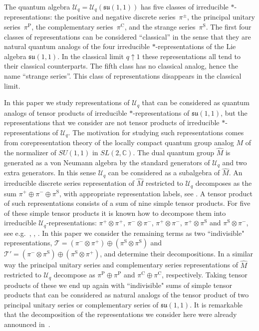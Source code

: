 \documentclass[pdftex]{sigma}
\numberwithin{equation}{section}
\numberwithin{theorem}{section}
\numberwithin{proposition}{section}
\numberwithin{lemma}{section}
\numberwithin{corollary}{section}
\numberwithin{definition}{section}
\numberwithin{example}{section}
\numberwithin{remark}{section}
\numberwithin{note}{section}
\newcommand{\C}{\mathbb C}
\newcommand{\su}{\mathfrak{su}}
\newcommand{\U}{\mathcal U}
\begin{document}
The quantum algebra $\U_q=\U_q(\su(1,1))$ has f\/ive classes of irreducible $*$-representations: the po\-si\-ti\-ve and negative discrete series~$\pi^\pm$, the principal unitary series~$\pi^{\mathrm{P}}$, the complementary series~$\pi^{\mathrm{C}}$, and the strange series~$\pi^{\mathrm{S}}$. The f\/irst four classes of representations can be considered ``classical'' in the sense that they are natural quantum analogs of the four irreducible $*$-representations of the Lie algebra $\su(1,1)$. In the classical limit $q \uparrow 1$ these representations all tend to their classical counterparts. The f\/ifth class has no classical analog, hence the name ``strange series''. This class of representations disappears in the classical limit.

In this paper we study representations of $\U_q$ that can be considered as quantum analogs of tensor products of irreducible $*$-representations of $\su(1,1)$, but the representations that we consider are not tensor products of irreducible $*$-representations of $\U_q$. The motivation for studying such representations comes from corepresentation theory of the locally compact quantum group analog $M$ of the normalizer of $SU(1,1)$ in $SL(2,\C)$. The dual quantum group $\widehat M$ is generated as a von Neumann algebra by the standard generators of $\U_q$ and two extra generators. In this sense $\U_q$ can be considered as a subalgebra of $\widehat M$.  An irreducible discrete series representation of $\widehat M$ restricted to $\U_q$ decomposes as the sum $\pi^+ \oplus \pi^- \oplus \pi^{\mathrm{S}}$, with appropriate representation labels, see \cite[Section 5]{GKK}. A tensor product of such representations consists of a sum of nine simple tensor products. For f\/ive of these simple tensor products it is known how to decompose them into irreducible $\U_q$-representations: $\pi^+\otimes \pi^+$, $\pi^- \otimes \pi^-$, $\pi^+\otimes \pi^-$, $\pi^+ \otimes \pi^{\mathrm{S}}$ and $\pi^{\mathrm{S}} \otimes \pi^-$, see e.g.~\cite[Section 4]{KMM}, \cite[Section 2]{KM}, \cite[Section 8]{Gr06}. In this paper we consider the remaining terms as two ``indivisible" representations, $\mathcal T =(\pi^- \otimes \pi^+) \oplus (\pi^{\mathrm{S}} \otimes \pi^{\mathrm{S}})$ and $\mathcal T'=(\pi^- \otimes \pi^{\mathrm{S}}) \oplus (\pi^{\mathrm{S}} \otimes \pi^+)$, and determine their decompositions. In a similar way the principal unitary series and complementary series representations of $\widehat M$ restricted to $\U_q$ decompose as $\pi^{\mathrm{P}} \oplus \pi^{\mathrm{P}}$ and $\pi^{\mathrm{C}} \oplus \pi^{\mathrm{C}}$, respectively. Taking tensor products of these we end up again with ``indivisible" sums of simple tensor products that can be considered as natural analogs of the tensor product of two principal unitary series or complementary series of $\su(1,1)$. It is remarkable that the decomposition of the representations we consider here were already announced in~\cite[Section~12]{KV}.
\end{document}
